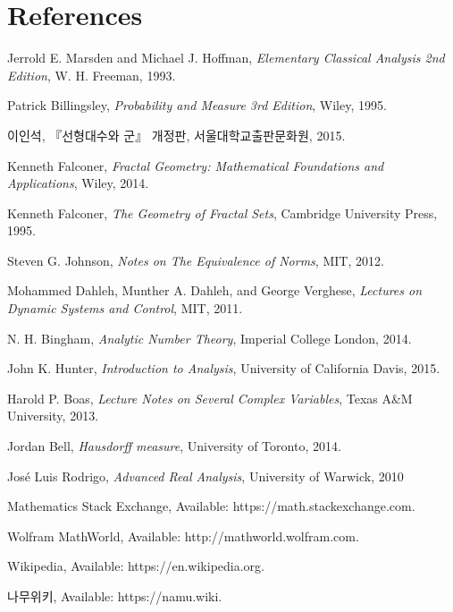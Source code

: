 \section*{References}
\normalsize\ttfamily
\begin{enumerate}[label = {[\arabic*]}]
    \item Jerrold E. Marsden and Michael J. Hoffman, \textit{Elementary Classical Analysis 2nd Edition}, W. H. Freeman, 1993.
    \item Patrick Billingsley, \textit{Probability and Measure 3rd Edition}, Wiley, 1995.
    \item \textrm{이인석}, \textrm{『선형대수와 군』 개정판}, \textrm{서울대학교출판문화원}, 2015.
    \item Kenneth Falconer, \textit{Fractal Geometry: Mathematical Foundations and Applications}, Wiley, 2014.
    \item Kenneth Falconer, \textit{The Geometry of Fractal Sets}, Cambridge University Press, 1995.
    \item Steven G. Johnson, \textit{Notes on The Equivalence of Norms}, MIT, 2012.
    \item Mohammed Dahleh, Munther A. Dahleh, and George Verghese, \textit{Lectures on Dynamic Systems and Control}, MIT, 2011.
    \item N. H. Bingham, \textit{Analytic Number Theory}, Imperial College London, 2014.
    \item John K. Hunter, \textit{Introduction to Analysis}, University of California Davis, 2015.
    \item Harold P. Boas, \textit{Lecture Notes on Several Complex Variables}, Texas A\&M University, 2013.
    \item Jordan Bell, \textit{Hausdorff measure}, University of Toronto, 2014.
    \item Jos\'e Luis Rodrigo, \textit{Advanced Real Analysis}, University of Warwick, 2010
    \item Mathematics Stack Exchange, Available: https://math.stackexchange.com.
    \item Wolfram MathWorld, Available: http://mathworld.wolfram.com.
    \item Wikipedia, Available: https://en.wikipedia.org.
    \item \textrm{나무위키}, Available: https://namu.wiki.
\end{enumerate}
\rmfamily
